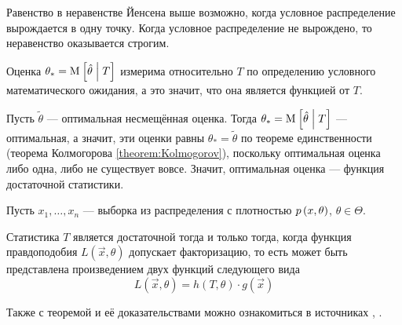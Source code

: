 \begin{remark}
    Равенство в неравенстве Йенсена выше возможно,
    когда условное распределение вырождается в одну точку.
    Когда условное распределение не вырождено,
    то неравенство оказывается строгим.
\end{remark}

\begin{remark}
    Оценка $\theta_* = \operatorname{M}_{} \left[ \hat{\theta} \;\middle|\; T \right]$ измерима относительно $T$
    по определению условного математического ожидания, а это значит,
    что она является функцией от $T$.

    Пусть $\tilde{\theta}$ --- оптимальная несмещённая оценка.
    Тогда $\theta_* = \operatorname{M}_{} \left[ \hat{\theta} \;\middle|\; T \right]$ --- оптимальная, а значит,
    эти оценки равны $\theta_* = \tilde{\theta}$ по теореме единственности
    (теорема Колмогорова \ref{theorem:Kolmogorov}),
    поскольку оптимальная оценка либо одна, либо не существует вовсе.
    Значит, оптимальная оценка --- функция достаточной статистики.
\end{remark}

\begin{theorem}
    Пусть $x_1, \dots, x_n$ --- выборка из распределения
    с плотностью $p\left(x,\theta\right)$, $\theta \in \Theta$.

    Статистика $T$ является достаточной тогда и только тогда, когда
    функция правдоподобия $L\left( \vec{x}, \theta \right)$
    допускает факторизацию, то есть может быть представлена
    произведением двух функций следующего вида
    $$L\left( \vec{x}, \theta \right)
        = h\left( T, \theta \right) \cdot g\left( \vec{x} \right)$$
\end{theorem}

\begin{remark}
    Также с теоремой и её доказательствами можно ознакомиться в источниках
    \cite[стр.~78]{MGTUXVII}, \cite[стр.~158]{BorovkovMS}.
\end{remark}

